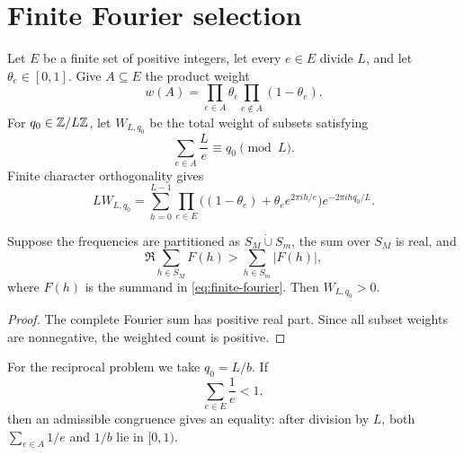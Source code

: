 \section{Finite Fourier selection}\label{sec:fourier}

Let $E$ be a finite set of positive integers, let every $e\in E$ divide $L$, and
let $\theta_e\in[0,1]$.  Give $A\subseteq E$ the product weight
\[
 w(A)=\prod_{e\in A}\theta_e
      \prod_{e\notin A}(1-\theta_e).
\]
For $q_0\in\mathbb Z/L\mathbb Z$, let $W_{L,q_0}$ be the total weight of subsets satisfying
\[
 \sum_{e\in A}\frac Le\equiv q_0\pmod L.
\]
Finite character orthogonality gives
\begin{equation}\label{eq:finite-fourier}
 LW_{L,q_0}
 =\sum_{h=0}^{L-1}
   \prod_{e\in E}\bigl((1-\theta_e)+\theta_e e^{2\pi ih/e}\bigr)
   e^{-2\pi ihq_0/L}.
\end{equation}

\begin{lemma}\label{lem:spectral-positivity}
Suppose the frequencies are partitioned as $S_M\dot\cup S_m$, the sum over
$S_M$ is real, and
\[
 \Re\sum_{h\in S_M}F(h)>\sum_{h\in S_m}|F(h)|,
\]
where $F(h)$ is the summand in \eqref{eq:finite-fourier}.  Then
$W_{L,q_0}>0$.
\end{lemma}
\begin{proof}
The complete Fourier sum has positive real part.  Since all subset weights are
nonnegative, the weighted count is positive.
\end{proof}

For the reciprocal problem we take $q_0=L/b$.  If
\begin{equation}\label{eq:no-wrap}
 \sum_{e\in E}\frac1e<1,
\end{equation}
then an admissible congruence gives an equality: after division by $L$, both
$\sum_{e\in A}1/e$ and $1/b$ lie in $[0,1)$.
